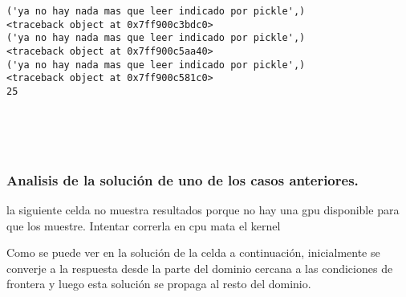 \documentclass[11pt]{article}
\begin{document}
    \begin{Verbatim}[commandchars=\\\{\}]
('ya no hay nada mas que leer indicado por pickle',)
<traceback object at 0x7ff900c3bdc0>
('ya no hay nada mas que leer indicado por pickle',)
<traceback object at 0x7ff900c5aa40>
('ya no hay nada mas que leer indicado por pickle',)
<traceback object at 0x7ff900c581c0>
25
    \end{Verbatim}

    \begin{center}
    \end{center}
    { \hspace*{\fill} \\}
    
    \begin{center}
    \end{center}
    { \hspace*{\fill} \\}
    
    \hypertarget{analisis-de-la-soluciuxf3n-de-uno-de-los-casos-anteriores.}{%
\subsubsection{Analisis de la solución de uno de los casos
anteriores.}\label{analisis-de-la-soluciuxf3n-de-uno-de-los-casos-anteriores.}}

la siguiente celda no muestra resultados porque no hay una gpu
disponible para que los muestre. Intentar correrla en cpu mata el kernel

Como se puede ver en la solución de la celda a continuación,
inicialmente se converje a la respuesta desde la parte del dominio
cercana a las condiciones de frontera y luego esta solución se propaga
al resto del dominio.
\end{document}
